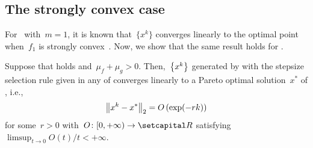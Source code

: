 \documentclass[../../main]{subfiles}
\begin{document}
\subsection{The strongly convex case}
For~ with~$m = 1$, it is known that~$\{x^k\}$ converges linearly to the optimal point when~$f_1$ is strongly convex~\cite{Beck2017}.
Now, we show that the same result holds for .
\begin{theorem} 
    Suppose that  holds and~$\mu_f + \mu_g > 0$.
    Then,~$\set*{x^k}$ generated by  with the stepsize selection rule given in any of  converges linearly to a Pareto optimal solution~$x^*$ of , i.e.,
    \begin{equation}
        \norm*{x^k - x^*}_2 = O\left(\exp(-rk)\right) 
    \end{equation}
    for some~$r > 0$ with~$O \colon [0, + \infty) \to \setR$ satisfying~$\limsup_{t \to 0} O(t) / t < + \infty$.
\end{theorem}
\end{document}
